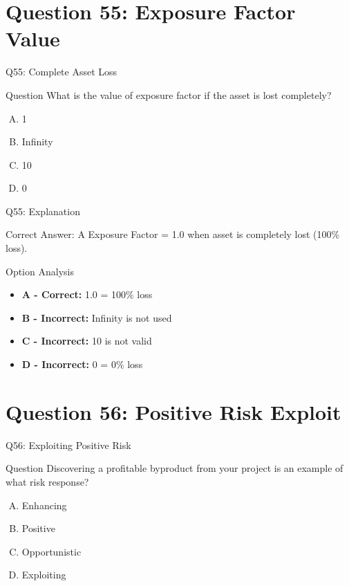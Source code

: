 \documentclass{beamer}
\begin{document}
	\section{Question 55: Exposure Factor Value}
	
	\begin{frame}{Q55: Complete Asset Loss}
		\begin{block}{Question}
			What is the value of exposure factor if the asset is lost completely?
		\end{block}
		\begin{enumerate}[(A)]
			\item 1
			\item Infinity
			\item 10
			\item 0
		\end{enumerate}
	\end{frame}
	
	\begin{frame}{Q55: Explanation}
		\begin{block}{Correct Answer: A}
			Exposure Factor = 1.0 when asset is completely lost (100\% loss).
		\end{block}
		\begin{block}{Option Analysis}
			\begin{itemize}
				\item \textbf{A - Correct:} 1.0 = 100\% loss
				\item \textbf{B - Incorrect:} Infinity is not used
				\item \textbf{C - Incorrect:} 10 is not valid
				\item \textbf{D - Incorrect:} 0 = 0\% loss
			\end{itemize}
		\end{block}
	\end{frame}
	
	\section{Question 56: Positive Risk Exploit}
	
	\begin{frame}{Q56: Exploiting Positive Risk}
		\begin{block}{Question}
			Discovering a profitable byproduct from your project is an example of what risk response?
		\end{block}
		\begin{enumerate}[(A)]
			\item Enhancing
			\item Positive
			\item Opportunistic
			\item Exploiting
		\end{enumerate}
	\end{frame}
	
\end{document}
